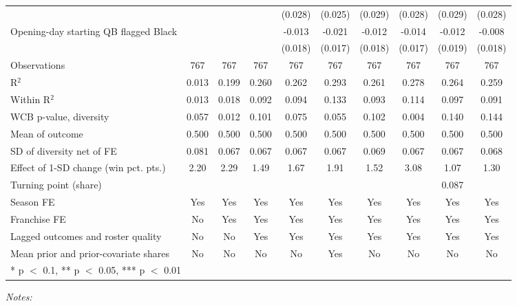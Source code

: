 \begin{table}[!h]
{\begin{threeparttable}
\begin{tabular}[t]{lccccccccc}
 &  &  &  & (0.028) & (0.025) & (0.029) & (0.028) & (0.029) & (0.028)\\
Opening-day starting QB flagged Black &  &  &  & -0.013 & -0.021 & -0.012 & -0.014 & -0.012 & -0.008\\
 &  &  &  & (0.018) & (0.017) & (0.018) & (0.017) & (0.019) & (0.018)\\
\midrule
Observations & 767 & 767 & 767 & 767 & 767 & 767 & 767 & 767 & 767\\
R$^2$ & 0.013 & 0.199 & 0.260 & 0.262 & 0.293 & 0.261 & 0.278 & 0.264 & 0.259\\
Within R$^2$ & 0.013 & 0.018 & 0.092 & 0.094 & 0.133 & 0.093 & 0.114 & 0.097 & 0.091\\
WCB p-value, diversity & 0.057 & 0.012 & 0.101 & 0.075 & 0.055 & 0.102 & 0.004 & 0.140 & 0.144\\
Mean of outcome & 0.500 & 0.500 & 0.500 & 0.500 & 0.500 & 0.500 & 0.500 & 0.500 & 0.500\\
SD of diversity net of FE & 0.081 & 0.067 & 0.067 & 0.067 & 0.067 & 0.069 & 0.067 & 0.067 & 0.068\\
Effect of 1-SD change (win pct. pts.) & 2.20 & 2.29 & 1.49 & 1.67 & 1.91 & 1.52 & 3.08 & 1.07 & 1.30\\
Turning point (share) &  &  &  &  &  &  &  & 0.087 & \\
Season FE & Yes & Yes & Yes & Yes & Yes & Yes & Yes & Yes & Yes\\
Franchise FE & No & Yes & Yes & Yes & Yes & Yes & Yes & Yes & Yes\\
Lagged outcomes and roster quality & No & No & Yes & Yes & Yes & Yes & Yes & Yes & Yes\\
Mean prior and prior-covariate shares & No & No & No & No & Yes & No & No & No & No\\
\bottomrule
\multicolumn{10}{l}{\rule{0pt}{1em}* p $<$ 0.1, ** p $<$ 0.05, *** p $<$ 0.01}\\
\end{tabular}
\begin{tablenotes}[para]
\item \textit{Notes:} 

\end{tablenotes}
\end{threeparttable}}
\end{table}
